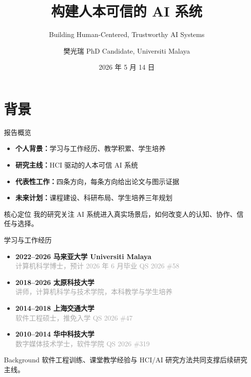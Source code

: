 \documentclass{beamer}
\title{构建人本可信的 AI 系统}
\subtitle{Building Human-Centered, Trustworthy AI Systems}
\author{樊光瑞 \quad PhD Candidate, Universiti Malaya}
\date{2026 年 5 月 14 日}
\newcommand{\smallmuted}[1]{{\small\textcolor{darkgray}{#1}}}
\newcommand{\tightitems}{\setlength\itemsep{2pt}}
\begin{document}
\maketitle

\section{背景}

\begin{frame}{报告概览}
\begin{itemize}\tightitems
  \item \textbf{个人背景：}学习与工作经历、教学积累、学生培养
  \item \textbf{研究主线：}HCI 驱动的人本可信 AI 系统
  \item \textbf{代表性工作：}四条方向，每条方向给出论文与图示证据
  \item \textbf{未来计划：}课程建设、科研布局、学生培养三年规划
\end{itemize}
\vspace{6mm}
\begin{block}{核心定位}
我的研究关注 AI 系统进入真实场景后，如何改变人的认知、协作、信任与选择。
\end{block}
\end{frame}

\begin{frame}{学习与工作经历}
\begin{itemize}\tightitems
  \item \textbf{2022--2026 \quad 马来亚大学 Universiti Malaya}\\
        \smallmuted{计算机科学博士，预计 2026 年 6 月毕业 \hfill QS 2026 \#58}
  \item \textbf{2018--2026 \quad 太原科技大学}\\
        \smallmuted{讲师，计算机科学与技术学院，本科教学与学生培养}
  \item \textbf{2014--2018 \quad 上海交通大学}\\
        \smallmuted{软件工程硕士，推免入学 \hfill QS 2026 \#47}
  \item \textbf{2010--2014 \quad 华中科技大学}\\
        \smallmuted{数字媒体技术学士，软件学院 \hfill QS 2026 \#319}
\end{itemize}
\vspace{2mm}
\begin{block}{Background}
软件工程训练、课堂教学经验与 HCI/AI 研究方法共同支撑后续研究主线。
\end{block}
\end{frame}
\end{document}
